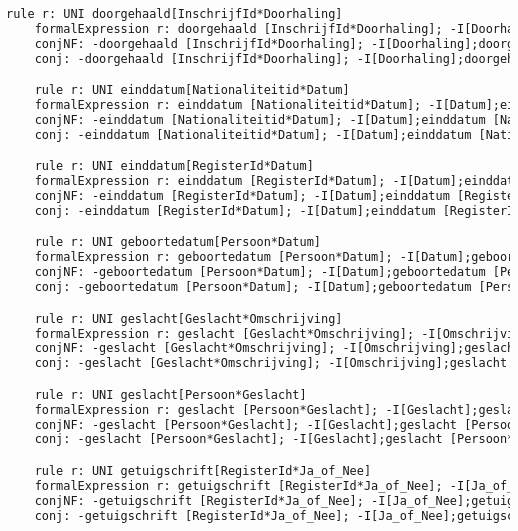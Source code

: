\begin{lstlisting}[language=TeX]
    rule r: UNI doorgehaald[InschrijfId*Doorhaling]
    formalExpression r: doorgehaald [InschrijfId*Doorhaling]; -I[Doorhaling];doorgehaald [InschrijfId*Doorhaling]~ |- -I[InschrijfId]
    conjNF: -doorgehaald [InschrijfId*Doorhaling]; -I[Doorhaling];doorgehaald [InschrijfId*Doorhaling]~\/ -I[InschrijfId]
    conj: -doorgehaald [InschrijfId*Doorhaling]; -I[Doorhaling];doorgehaald [InschrijfId*Doorhaling]~\/ -I[InschrijfId]

    rule r: UNI einddatum[Nationaliteitid*Datum]
    formalExpression r: einddatum [Nationaliteitid*Datum]; -I[Datum];einddatum [Nationaliteitid*Datum]~ |- -I[Nationaliteitid]
    conjNF: -einddatum [Nationaliteitid*Datum]; -I[Datum];einddatum [Nationaliteitid*Datum]~\/ -I[Nationaliteitid]
    conj: -einddatum [Nationaliteitid*Datum]; -I[Datum];einddatum [Nationaliteitid*Datum]~\/ -I[Nationaliteitid]

    rule r: UNI einddatum[RegisterId*Datum]
    formalExpression r: einddatum [RegisterId*Datum]; -I[Datum];einddatum [RegisterId*Datum]~ |- -I[RegisterId]
    conjNF: -einddatum [RegisterId*Datum]; -I[Datum];einddatum [RegisterId*Datum]~\/ -I[RegisterId]
    conj: -einddatum [RegisterId*Datum]; -I[Datum];einddatum [RegisterId*Datum]~\/ -I[RegisterId]

    rule r: UNI geboortedatum[Persoon*Datum]
    formalExpression r: geboortedatum [Persoon*Datum]; -I[Datum];geboortedatum [Persoon*Datum]~ |- -I[Persoon]
    conjNF: -geboortedatum [Persoon*Datum]; -I[Datum];geboortedatum [Persoon*Datum]~\/ -I[Persoon]
    conj: -geboortedatum [Persoon*Datum]; -I[Datum];geboortedatum [Persoon*Datum]~\/ -I[Persoon]

    rule r: UNI geslacht[Geslacht*Omschrijving]
    formalExpression r: geslacht [Geslacht*Omschrijving]; -I[Omschrijving];geslacht [Geslacht*Omschrijving]~ |- -I[Geslacht]
    conjNF: -geslacht [Geslacht*Omschrijving]; -I[Omschrijving];geslacht [Geslacht*Omschrijving]~\/ -I[Geslacht]
    conj: -geslacht [Geslacht*Omschrijving]; -I[Omschrijving];geslacht [Geslacht*Omschrijving]~\/ -I[Geslacht]

    rule r: UNI geslacht[Persoon*Geslacht]
    formalExpression r: geslacht [Persoon*Geslacht]; -I[Geslacht];geslacht [Persoon*Geslacht]~ |- -I[Persoon]
    conjNF: -geslacht [Persoon*Geslacht]; -I[Geslacht];geslacht [Persoon*Geslacht]~\/ -I[Persoon]
    conj: -geslacht [Persoon*Geslacht]; -I[Geslacht];geslacht [Persoon*Geslacht]~\/ -I[Persoon]

    rule r: UNI getuigschrift[RegisterId*Ja_of_Nee]
    formalExpression r: getuigschrift [RegisterId*Ja_of_Nee]; -I[Ja_of_Nee];getuigschrift [RegisterId*Ja_of_Nee]~ |- -I[RegisterId]
    conjNF: -getuigschrift [RegisterId*Ja_of_Nee]; -I[Ja_of_Nee];getuigschrift [RegisterId*Ja_of_Nee]~\/ -I[RegisterId]
    conj: -getuigschrift [RegisterId*Ja_of_Nee]; -I[Ja_of_Nee];getuigschrift [RegisterId*Ja_of_Nee]~\/ -I[RegisterId]


\end{lstlisting}
